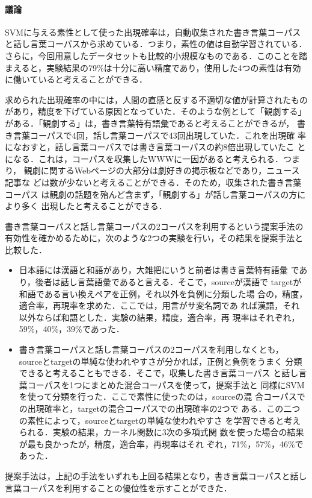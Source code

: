 \documentclass{nlp}
\begin{document}
\paragraph{議論}
SVMに与える素性として使った出現確率は，自動収集された書き言葉コーパス
と話し言葉コーパスから求めている．つまり，素性の値は自動学習されている．
さらに，今回用意したデータセットも比較的小規模なものである．このことを踏
まえると，実験結果の79\%は十分に高い精度であり，使用した4つの素性は有効
に働いていると考えることができる．

求められた出現確率の中には，人間の直感と反する不適切な値が計算されたもの
があり，精度を下げている原因となっていた．そのような例として「観劇する」
がある．「観劇する」は，書き言葉特有語彙であると考えることができるが，
書き言葉コーパスで4回，話し言葉コーパスで43回出現していた．これを出現確
率になおすと，話し言葉コーパスでは書き言葉コーパスの約8倍出現していたこ
とになる．これは，コーパスを収集したWWWに一因があると考えられる．つまり，
観劇に関するWebページの大部分は劇好きの掲示板などであり，ニュース記事な
どは数が少ないと考えることができる．そのため，収集された書き言葉コーパス
は観劇の話題を殆んど含まず，「観劇する」が話し言葉コーパスの方により多く
出現したと考えることができる．

書き言葉コーパスと話し言葉コーパスの2コーパスを利用するという提案手法の
有効性を確かめるために，次のような2つの実験を行い，その結果を提案手法と
比較した．
\begin{itemize}
 \item 日本語には漢語と和語があり，大雑把にいうと前者は書き言葉特有語彙
       であり，後者は話し言葉語彙であると言える．そこで，sourceが漢語で
       targetが和語である言い換えペアを正例，それ以外を負例に分類した場
       合の，精度，適合率，再現率を求めた．ここでは，用言がサ変名詞であ
       れば漢語，それ以外ならば和語とした．実験の結果，精度，適合率，再
       現率はそれぞれ，59\%，40\%，39\%であった．
       
 \item 書き言葉コーパスと話し言葉コーパスの2コーパスを利用しなくとも，
       sourceとtargetの単純な使われやすさが分かれば，正例と負例をうまく
       分類できると考えることもできる．そこで，収集した書き言葉コーパス
       と話し言葉コーパスを1つにまとめた混合コーパスを使って，提案手法と
       同様にSVMを使って分類を行った．ここで素性に使ったのは，sourceの混
       合コーパスでの出現確率と，targetの混合コーパスでの出現確率の2つで
       ある．この二つの素性によって，sourceとtargetの単純な使われやすさ
       を学習できると考えられる．実験の結果，カーネル関数に3次の多項式関
       数を使った場合の結果が最も良かったが，精度，適合率，再現率はそれ
       ぞれ，71\%，57\%，46\%であった．
\end{itemize}       
提案手法は，上記の手法をいずれも上回る結果となり，書き言葉コーパスと話し
言葉コーパスを利用することの優位性を示すことができた．
\end{document}
